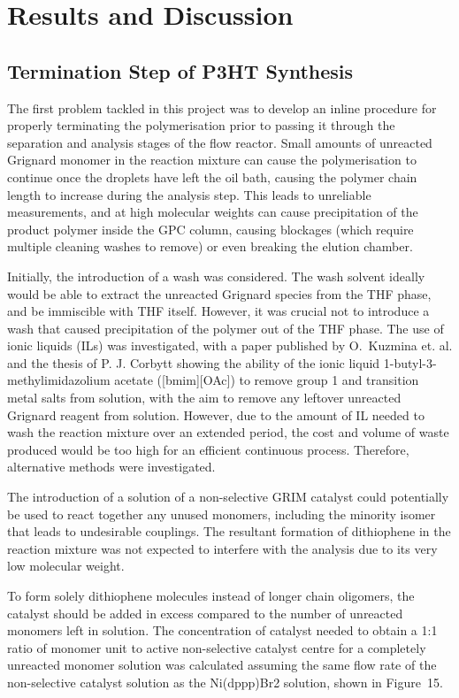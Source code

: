 \chapter{Results and Discussion}

\section{Termination Step of P3HT Synthesis}

The first problem tackled in this project was to develop an inline procedure for properly terminating the polymerisation prior to passing it through the separation and analysis stages of the flow reactor. Small amounts of unreacted Grignard monomer in the reaction mixture can cause the polymerisation to continue once the droplets have left the oil bath, causing the polymer chain length to increase during the analysis step. This leads to unreliable measurements, and at high molecular weights can cause precipitation of the product polymer inside the GPC column, causing blockages (which require multiple cleaning washes to remove) or even breaking the elution chamber.

Initially, the introduction of a wash was considered. The wash solvent ideally would be able to extract the unreacted Grignard species from the THF phase, and be immiscible with THF itself. However, it was crucial not to introduce a wash that caused precipitation of the polymer out of the THF phase. The use of ionic liquids (ILs) was investigated, with a paper published by O. Kuzmina et. al. and the thesis of P. J. Corbytt showing the ability of the ionic liquid 1-butyl-3-methylimidazolium acetate ([bmim][OAc]) to remove group 1 and transition metal salts from solution, with the aim to remove any leftover unreacted Grignard reagent from solution. However, due to the amount of IL needed to wash the reaction mixture over an extended period, the cost and volume of waste produced would be too high for an efficient continuous process. Therefore, alternative methods were investigated.

The introduction of a solution of a non-selective GRIM catalyst could potentially be used to react together any unused monomers, including the minority isomer that leads to undesirable couplings. The resultant formation of dithiophene in the reaction mixture was not expected to interfere with the analysis due to its very low molecular weight.  

To form solely dithiophene molecules instead of longer chain oligomers, the catalyst should be added in excess compared to the number of unreacted monomers left in solution. The concentration of catalyst needed to obtain a 1:1 ratio of monomer unit to active non-selective catalyst centre for a completely unreacted monomer solution was calculated assuming the same flow rate of the non-selective catalyst solution as the Ni(dppp)Br2 solution, shown in Figure 15. 



